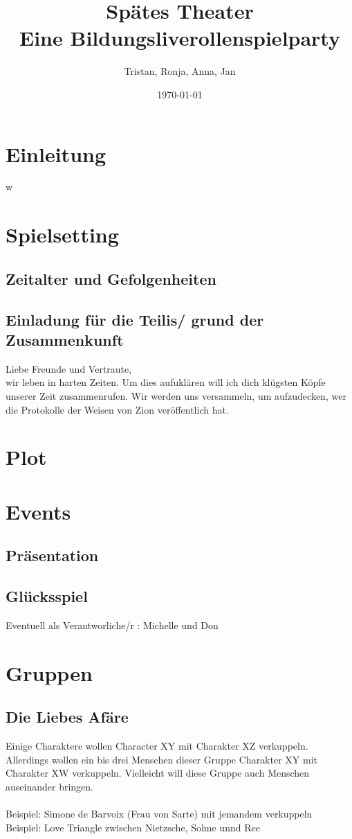 \documentclass[12pt, a4paper, openany]{report}
\title{
    {Spätes Theater}\\
    {\large{Eine Bildungsliverollenspielparty}}\\
}
\author{Tristan, Ronja, Anna, Jan}
\date{\today}
\begin{document}
\maketitle
\frontmatter
\tableofcontents
\mainmatter

\chapter{Einleitung}

w

\chapter{Spielsetting}

\section{Zeitalter und Gefolgenheiten}

\section{Einladung für die Teilis/ grund der Zusammenkunft}
Liebe Freunde und Vertraute,\\
wir leben in harten Zeiten. 
Um dies aufuklären will ich dich klügsten Köpfe unserer Zeit zusammenrufen. 
Wir werden uns versammeln, um aufzudecken, wer die Protokolle der Weisen von Zion veröffentlich hat. 

\chapter{Plot}
\chapter{Events}
\section{Präsentation}
\section{Glücksspiel}
Eventuell als Verantworliche/r : Michelle und Don

\chapter{Gruppen}
\section{Die Liebes Afäre}
Einige Charaktere wollen Character XY mit Charakter XZ verkuppeln.
Allerdings wollen ein bis drei Menschen dieser Gruppe Charakter XY mit Charakter XW verkuppeln.
Vielleicht will diese Gruppe auch Menschen auseinander bringen.\\\\
Beispiel: Simone de Barvoix (Frau von Sarte) mit jemandem verkuppeln\\
Beispiel: Love Triangle zwischen Nietzsche, Solme unnd Ree
\end{document}
